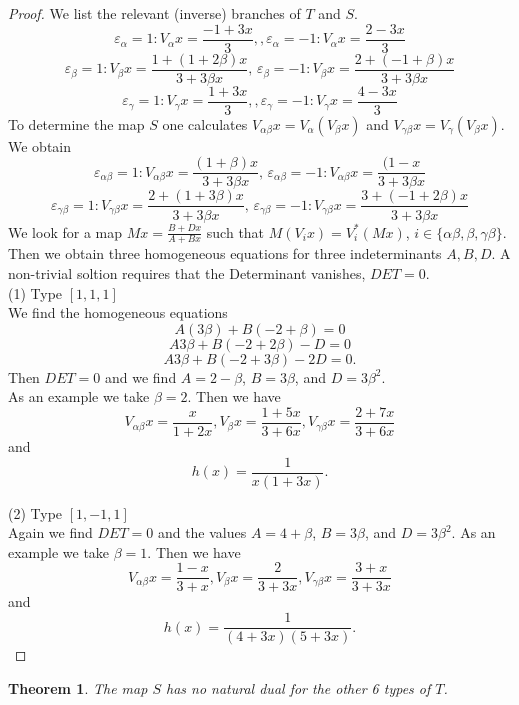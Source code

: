 \documentclass[12pt]{article}
\newtheorem{theorem}{Theorem}
\begin{document}
	\begin{proof}
	We list the relevant (inverse) branches of $T$ and $S$.
	$$ \varepsilon_\alpha =1: V_\alpha x = \frac{-1+3x}{3}  , , \varepsilon_\alpha =-1: V_\alpha x = \frac{2 - 3x}{3} $$          
		$$ \varepsilon_\beta =1: V_\beta x = \frac{1 + (1+2 \beta)x}{3 + 3 \beta x}, \, \varepsilon_\beta = -1 : V_\beta x = \frac{2 + (-1 + \beta )x}{3 + 3\beta x}$$
		$$ \varepsilon_\gamma =1: V_\gamma x = \frac{1+3x}{3}  , , \varepsilon_\gamma =-1: V_\gamma x = \frac{4 - 3x}{3}           $$
	To determine the map $S$ one calculates  $V_{\alpha \beta}x = V_\alpha (V_\beta x)$
	and $V_{\gamma \beta}x = V_\gamma (V_\beta x)$.\\	
	We obtain
	$$ \varepsilon_{\alpha\beta} = 1: V_{\alpha\beta} x = \frac{(1+\beta)x}{3 + 3 \beta x}, \,\varepsilon_{\alpha\beta} = -1: V_{\alpha\beta} x = \frac{(1 - x}{3 + 3 \beta x}$$
		$$ \varepsilon_{\gamma\beta} = 1: V_{\gamma\beta} x = \frac{2+(1+3\beta)x}{3 + 3 \beta x}, \,\varepsilon_{\gamma\beta} = -1: V_{\gamma\beta} x = \frac{3 +(-1+2\beta)  x}{3 + 3 \beta x}$$
	 We look for a map $Mx = \frac{B + D x}{A+ Bx}$ such that $M (V_i x) = V_i^{*} (Mx)$, $ i \in \{\alpha \beta, \beta, \gamma \beta\}$.
	Then we obtain three homogeneous equations for three indeterminants $A, B, D$. A non-trivial  soltion requires that the Determinant vanishes,  $DET = 0$.\\ 
	(1)  Type $[1,1,1]$\\
	We find the homogeneous equations
	$$ A(3\beta) + B(-2 + \beta) = 0$$
	$$ A 3\beta + B(-2 + 2\beta) - D =0$$
	$$A3\beta + B (-2 + 3\beta) -2D = 0.$$
	Then $DET = 0$ and we find $A= 2- \beta$, $B= 3\beta$, and $D=3\beta^2$.\\
	As an example we take $\beta = 2$. Then we have $$V_{\alpha \beta}x  = \frac{x}{1+2x}, V_\beta x = \frac{1+5x}{3+6x}, V_{\gamma \beta}x = \frac{2+7x}{3+6x} $$ and $$h(x) = \frac{1}{x(1+3x)}.$$
	
	(2) Type $[1,-1,1]$\\
	Again we find $DET = 0$ and the values $A= 4 + \beta$, $B= 3 \beta$, and $D= 3 \beta^2$.	
		As an example we take $\beta = 1$. Then we have $$V_{\alpha \beta}x  = \frac{1-x}{3+x}, V_\beta x = \frac{2}{3+3x}, V_{\gamma \beta}x = \frac{3+x}{3+3x} $$ and $$h(x) = \frac{1}{(4+3x)(5+3x)}.$$
		
	\end{proof}
	\begin{theorem}  
		The map $S$ has no natural dual for the  other 6 types of $T$.
	\end{theorem}
	
\end{document}
